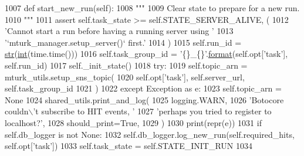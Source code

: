 \begin{DoxyCode}
1007     \textcolor{keyword}{def }start\_new\_run(self):
1008         \textcolor{stringliteral}{"""}
1009 \textcolor{stringliteral}{        Clear state to prepare for a new run.}
1010 \textcolor{stringliteral}{        """}
1011         \textcolor{keyword}{assert} self.task\_state >= self.STATE\_SERVER\_ALIVE, (
1012             \textcolor{stringliteral}{'Cannot start a run before having a running server using '}
1013             \textcolor{stringliteral}{'`mturk\_manager.setup\_server()` first.'}
1014         )
1015         self.run\_id = \hyperlink{namespacegenerate__task__READMEs_a5b88452ffb87b78c8c85ececebafc09f}{str}(\hyperlink{namespacelanguage__model_1_1eval__ppl_a7d12ee00479673c5c8d1f6d01faa272a}{int}(time.time()))
1016         self.task\_group\_id = \textcolor{stringliteral}{'\{\}\_\{\}'}.\hyperlink{namespaceparlai_1_1chat__service_1_1services_1_1messenger_1_1shared__utils_a32e2e2022b824fbaf80c747160b52a76}{format}(self.opt[\textcolor{stringliteral}{'task'}], self.run\_id)
1017         self.\_init\_state()
1018         \textcolor{keywordflow}{try}:
1019             self.topic\_arn = mturk\_utils.setup\_sns\_topic(
1020                 self.opt[\textcolor{stringliteral}{'task'}], self.server\_url, self.task\_group\_id
1021             )
1022         \textcolor{keywordflow}{except} Exception \textcolor{keyword}{as} e:
1023             self.topic\_arn = \textcolor{keywordtype}{None}
1024             shared\_utils.print\_and\_log(
1025                 logging.WARN,
1026                 \textcolor{stringliteral}{'Botocore couldn\(\backslash\)'t subscribe to HIT events, '}
1027                 \textcolor{stringliteral}{'perhaps you tried to register to localhost?'},
1028                 should\_print=\textcolor{keyword}{True},
1029             )
1030             print(repr(e))
1031         \textcolor{keywordflow}{if} self.db\_logger \textcolor{keywordflow}{is} \textcolor{keywordflow}{not} \textcolor{keywordtype}{None}:
1032             self.db\_logger.log\_new\_run(self.required\_hits, self.opt[\textcolor{stringliteral}{'task'}])
1033         self.task\_state = self.STATE\_INIT\_RUN
1034 
\end{DoxyCode}
\mbox{\label{classparlai_1_1mturk_1_1core_1_1dev_1_1mturk__manager_1_1MTurkManager_a3e7d8f931122df4baca89ef8f189680f}} 

